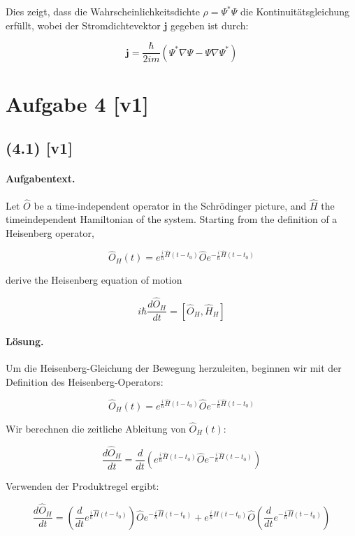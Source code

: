 \documentclass[11pt,a4paper]{article}
\begin{document}
Dies zeigt, dass die Wahrscheinlichkeitsdichte \(\rho = \Psi^* \Psi\) die Kontinuitätsgleichung erfüllt, wobei der Stromdichtevektor \(\mathbf{j}\) gegeben ist durch:

\[
\mathbf{j} = \frac{\hbar}{2 i m} \left(\Psi^* \nabla \Psi - \Psi \nabla \Psi^*\right)
\]

\section*{Aufgabe 4 [v1]}
\subsection*{(4.1) [v1]}
\paragraph{Aufgabentext.}
Let $\hat{O}$ be a time-independent operator in the Schrödinger picture, and $\hat{H}$ the timeindependent Hamiltonian of the system. Starting from the definition of a Heisenberg operator,

$$
\hat{O}_H(t)=e^{\frac{i}{\hbar} \hat{H}\left(t-t_0\right)} \hat{O} e^{-\frac{i}{\hbar} \hat{H}\left(t-t_0\right)}
$$

derive the Heisenberg equation of motion

$$
i \hbar \frac{d \hat{O}_H}{d t}=\left[\hat{O}_H, \hat{H}_H\right]
$$

\paragraph{Lösung.}
Um die Heisenberg-Gleichung der Bewegung herzuleiten, beginnen wir mit der Definition des Heisenberg-Operators:

\[
\hat{O}_H(t) = e^{\frac{i}{\hbar} \hat{H}(t-t_0)} \hat{O} e^{-\frac{i}{\hbar} \hat{H}(t-t_0)}
\]

Wir berechnen die zeitliche Ableitung von \(\hat{O}_H(t)\):

\[
\frac{d \hat{O}_H}{d t} = \frac{d}{d t} \left( e^{\frac{i}{\hbar} \hat{H}(t-t_0)} \hat{O} e^{-\frac{i}{\hbar} \hat{H}(t-t_0)} \right)
\]

Verwenden der Produktregel ergibt:

\[
\frac{d \hat{O}_H}{d t} = \left( \frac{d}{d t} e^{\frac{i}{\hbar} \hat{H}(t-t_0)} \right) \hat{O} e^{-\frac{i}{\hbar} \hat{H}(t-t_0)} + e^{\frac{i}{\hbar} \hat{H}(t-t_0)} \hat{O} \left( \frac{d}{d t} e^{-\frac{i}{\hbar} \hat{H}(t-t_0)} \right)
\]
\end{document}
